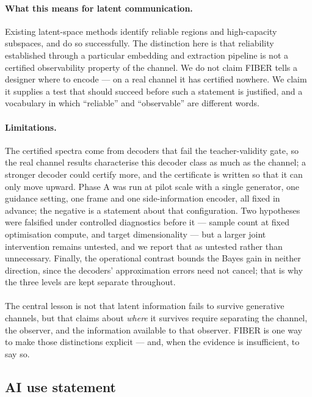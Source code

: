 \documentclass{article}
\theoremstyle{definition}
\begin{document}
\paragraph{What this means for latent communication.}
Existing latent-space methods identify reliable regions and high-capacity subspaces, and
do so successfully. The distinction here is that reliability established through a
particular embedding and extraction pipeline is not a certified observability property of
the channel. We do not claim FIBER tells a designer where to encode --- on a real channel
it has certified nowhere. We claim it supplies a test that should succeed before such a
statement is justified, and a vocabulary in which ``reliable'' and ``observable'' are
different words.

\paragraph{Limitations.}
The certified spectra come from decoders that fail the teacher-validity gate, so the real
channel results characterise this decoder class as much as the channel; a stronger decoder
could certify more, and the certificate is written so that it can only move upward.
Phase A was run at pilot scale with a single generator, one guidance setting, one frame
and one side-information encoder, all fixed in advance; the negative is a statement about
that configuration. Two hypotheses were falsified under controlled diagnostics before it
--- sample count at fixed optimisation compute, and target dimensionality --- but a
larger joint intervention remains untested, and we report that as untested rather than
unnecessary. Finally, the operational contrast bounds the Bayes gain in neither direction,
since the decoders' approximation errors need not cancel; that is why the three levels are
kept separate throughout.

\paragraph{}
The central lesson is not that latent information fails to survive generative channels,
but that claims about \emph{where} it survives require separating the channel, the
observer, and the information available to that observer. FIBER is one way to make those
distinctions explicit --- and, when the evidence is insufficient, to say so.

\subsection*{AI use statement}
\end{document}
